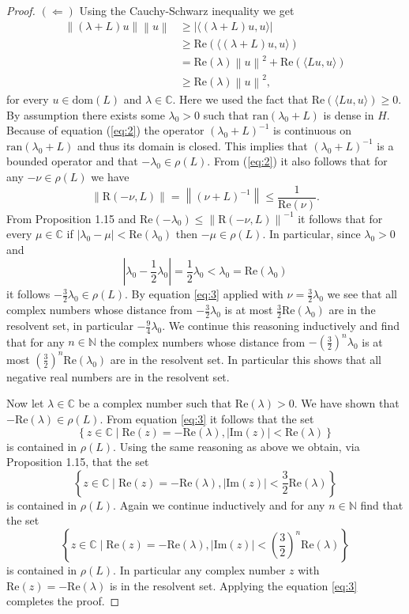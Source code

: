 \documentclass[a4paper,11pt]{article}
\newcommand{\N}{\mathbb N}
\newcommand{\C}{\mathbb C}
\newcommand{\set}[1]{\left\{#1\right\}} %
\newcommand{\abs}[1]{\left|#1\right|} %
\newcommand{\norm}[1]{\left\lVert#1\right\rVert} %
\newcommand{\re}{\mathrm{Re}}
\newcommand{\ima}{\mathrm{Im}}
\newcommand{\res}{\mathrm{R}}
\newcommand{\dom}{\mathrm{dom}}
\newcommand{\im}{\mathrm{ran}}
\theoremstyle{definition}
\begin{document}
\begin{proof}
    $(\Longleftarrow)$ Using the Cauchy-Schwarz inequality we get 
    \begin{align}
        \norm{(\lambda+L)u}\norm{u}
        &\ge \abs{\langle(\lambda+L)u,u\rangle} \nonumber \\
        &\ge \re(\langle(\lambda+L)u,u\rangle) \nonumber \\
        &=\re(\lambda)\norm{u}^2+\re(\langle Lu,u\rangle) \nonumber \\
        &\ge \re(\lambda)\norm{u}^2, \label{eq:2}
    \end{align}
    for every $u\in\dom(L)$ and $\lambda \in \C$. 
    Here we used the fact that $\re(\langle Lu,u\rangle)\ge 0$. 
    By assumption there exists some $\lambda_0>0$ such that $\im(\lambda_0+L)$ is dense in $H$. 
    Because of equation (\ref{eq:2}) the operator $(\lambda_0+L)^{-1}$ is continuous on $\im(\lambda_0+L)$ and thus its domain is closed.
    This implies that $(\lambda_0+L)^{-1}$ is a bounded operator and that $-\lambda_0\in \rho(L)$. 
    From (\ref{eq:2}) it also follows that for any $-\nu \in \rho(L)$ we have
    \begin{equation}\label{eq:3}
        \norm{\res(-\nu,L)} = \norm{(\nu+L)^{-1}} \le \frac{1}{\re(\nu)}.
    \end{equation}
    From Proposition 1.15 and $\re(-\lambda_0) \le \norm{\res(-\nu,L)}^{-1}$ it follows that for every $\mu \in \C$ 
    if $|\lambda_0-\mu|< \re(\lambda_0)$ then $-\mu \in \rho(L)$.
    In particular, since $\lambda_0 > 0$ and 
    \[\abs{\lambda_0 - \frac{1}{2} \lambda_0} = \frac{1}{2}\lambda_0 < \lambda_0 = \re(\lambda_0)\]
    it follows $-\frac{3}{2}\lambda_0\in \rho(L)$. 
    By equation \eqref{eq:3} applied with $\nu = \frac{3}{2}\lambda_0$ we see that all complex numbers whose distance from $-\frac{3}{2}\lambda_0$ is at most $\frac{3}{2}\re(\lambda_0)$ are in the resolvent set, in particular $-\frac{9}{4}\lambda_0$.
    We continue this reasoning inductively and find that for any $n \in \N$ the complex numbers whose distance from $-\left(\frac{3}{2}\right)^n\lambda_0$ is at most $\left(\frac{3}{2}\right)^n\re(\lambda_0)$ are in the resolvent set.
    In particular this shows that all negative real numbers are in the resolvent set.

    Now let $\lambda \in \C$ be a complex number such that $\re(\lambda) > 0$. We have shown that $-\re(\lambda) \in \rho(L)$.
    From equation \eqref{eq:3} it follows that the set 
    \[\set{z\in\C\mid \re(z)=-\re(\lambda), |\ima(z)|<\re(\lambda)}\]
    is contained in $\rho(L)$.
    Using the same reasoning as above we obtain, via Proposition 1.15, that the set 
    \[\set{z\in\C\mid \re(z)=-\re(\lambda), |\ima(z)|< \frac{3}{2}\re(\lambda)}\]
    is contained in $\rho(L)$.
    Again we continue inductively and for any $n \in \N$ find that the set 
    \[\set{z\in\C\mid \re(z)=-\re(\lambda), |\ima(z)|< \left(\frac{3}{2}\right)^n \re(\lambda)}\]
    is contained in $\rho(L)$.
    In particular any complex number $z$ with $\re(z) = -\re(\lambda)$ is in the resolvent set.
    Applying the equation \eqref{eq:3} completes the proof.


\end{proof}
\end{document}
